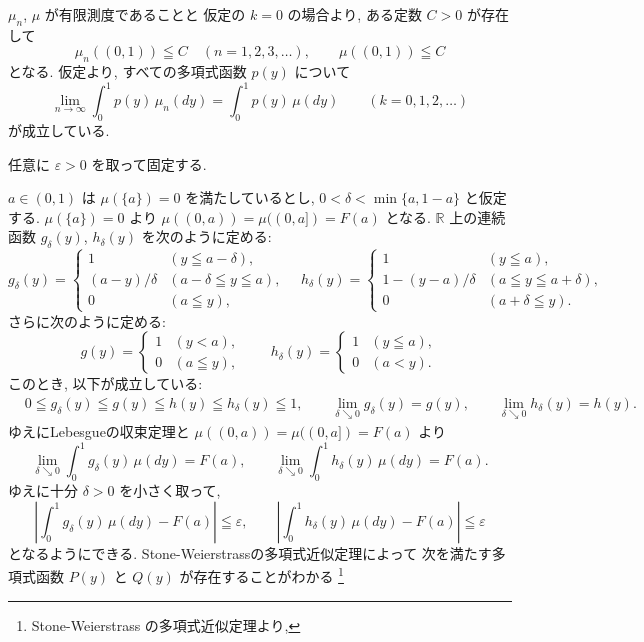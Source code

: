 \documentclass[12pt,twoside]{jarticle}
\makeatletter
\newcommand\R{{\mathbb R}} %
\newcommand\eps{\varepsilon}
\theoremstyle{jplain}
\theoremstyle{jplain}
\theoremstyle{jplain}
\numberwithin{theorem}{section}
\numberwithin{equation}{section}
\numberwithin{figure}{section}
\numberwithin{table}{section}
\renewenvironment{proof}[1][\proofname]{\par
  \normalfont
  \topsep6\p@\@plus6\p@ \trivlist
  \item[\hskip\labelsep{\bfseries #1}\@addpunct{\bfseries.}]\ignorespaces
}{%
  \endtrivlist
}
\renewcommand{\proofname}{証明}
\makeatother
\begin{document}
\begin{proof}
$\mu_n$, $\mu$ が有限測度であることと
仮定の $k=0$ の場合より, ある定数 $C>0$ が存在して
\[
\mu_n((0,1))\leqq C \quad (n=1,2,3,\ldots),
\qquad
\mu((0,1))\leqq C
\]
となる. 仮定より, すべての多項式函数 $p(y)$ について
\[
\lim_{n\to\infty}
\int_0^1 p(y)\,\mu_n(dy)
=
\int_0^1 p(y)\,\mu(dy)
\qquad
(k=0,1,2,\ldots)
\tag{1}
\]
が成立している.

任意に $\eps>0$ を取って固定する.

$a\in(0,1)$ は $\mu(\{a\})=0$ を満たしているとし,
$0<\delta<\min\{a,1-a\}$ と仮定する.
$\mu(\{a\})=0$ より $\mu((0,a))=\mu((0,a])=F(a)$ となる.
$\R$ 上の連続函数 $g_\delta(y)$, $h_\delta(y)$ を次のように定める:
\[
g_\delta(y)=
\begin{cases}
1 & (y\leqq a-\delta), \\
(a-y)/\delta  & (a-\delta\leqq y\leqq a), \\
0 & (a\leqq y),
\end{cases}
\quad
h_\delta(y)=
\begin{cases}
1 & (y\leqq a), \\
1-(y-a)/\delta  & (a\leqq y\leqq a+\delta), \\
0 & (a+\delta\leqq y).
\end{cases}
\]
さらに次のように定める:
\[
g(y)=
\begin{cases}
1 & (y<a), \\
0 & (a\leqq y),
\end{cases}
\qquad
h_\delta(y)=
\begin{cases}
1 & (y\leqq a), \\
0 & (a< y).
\end{cases}
\]
このとき, 以下が成立している:
\begin{align*}
&
0\leqq g_\delta(y)\leqq g(y)\leqq h(y)\leqq h_\delta(y)\leqq 1,
\qquad
\lim_{\delta\searrow 0}g_\delta(y)=g(y),
\qquad
\lim_{\delta\searrow 0}h_\delta(y)=h(y).
\end{align*}
ゆえにLebesgueの収束定理と $\mu((0,a))=\mu((0,a])=F(a)$ より
\[
\lim_{\delta\searrow 0}\int_0^1 g_\delta(y)\,\mu(dy)
=F(a),
\qquad
\lim_{\delta\searrow 0}\int_0^1 h_\delta(y)\,\mu(dy)
=F(a).
\]
ゆえに十分 $\delta>0$ を小さく取って,
\[
\left|\int_0^1 g_\delta(y)\,\mu(dy)-F(a) \right|\leqq\eps,
\qquad
\left|\int_0^1 h_\delta(y)\,\mu(dy)-F(a) \right|\leqq\eps
\tag{2}
\]
となるようにできる.
Stone-Weierstrassの多項式近似定理によって
次を満たす多項式函数 $P(y)$ と $Q(y)$ が存在することがわかる%
\footnote{Stone-Weierstrass の多項式近似定理より,
}
\end{proof}
\end{document}
